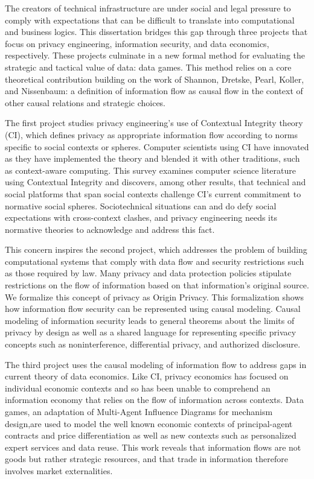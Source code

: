 \documentclass[../thesis.tex]{subfiles}
\begin{document}
 The creators of technical infrastructure are under social and
 legal pressure to comply with expectations that can be difficult
 to translate into computational and business logics.
 This dissertation bridges this gap through three projects that focus on
 privacy engineering, information security, and data economics, respectively.
 These projects culminate in a new formal method for evaluating the strategic
 and tactical value of data: data games.
 This method relies on a core theoretical contribution building on the work of
 Shannon, Dretske, Pearl, Koller, and Nissenbaum: a definition of information
 flow as causal flow in the context
 of other causal relations and strategic choices.

 The first project studies privacy engineering's use of
 Contextual Integrity theory (CI), which defines
 privacy as appropriate information flow according to norms
 specific to social contexts or spheres.
 Computer scientists using CI
 have innovated as they have implemented the theory and
 blended it with other traditions, such as context-aware
 computing. This survey examines
 computer science literature using Contextual Integrity and
 discovers, among other results, that technical and social platforms
 that span social contexts challenge CI's current commitment
 to normative social spheres.
 Sociotechnical situations can and do defy social expectations
 with cross-context clashes, and privacy engineering
 needs its normative theories to acknowledge and address this
 fact.
 
 This concern inspires the second project, which addresses the
 problem of building computational systems that comply with data
 flow and security restrictions such as those required by law.
 Many privacy and data protection policies stipulate
 restrictions on the flow of information based on that
 information's original source.
 We formalize this concept of privacy as Origin Privacy.
 This formalization shows how information flow security
 can be represented using causal modeling.
 Causal modeling of information security leads to
 general theorems about the limits of privacy by design
 as well as a shared language for representing specific
 privacy concepts such as noninterference, differential
 privacy, and authorized disclosure.

 The third project uses the causal modeling of information
 flow to address gaps in current theory of data economics.
 Like CI, privacy economics has focused on individual
 economic contexts and so has been unable to comprehend
 an information economy that relies on the flow of
 information across contexts.
 Data games, an adaptation of Multi-Agent Influence Diagrams
 for mechanism design,are used to model the well known
 economic contexts of principal-agent contracts and
 price differentiation as well as new contexts
 such as personalized expert services and data reuse.
 This work reveals that information flows are not
 goods but rather strategic resources, and that
 trade in information therefore involves
 market externalities.
 
 
\end{document}
